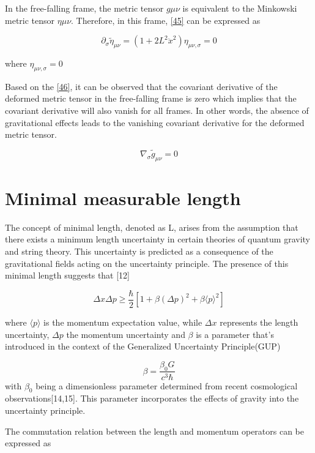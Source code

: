 \documentclass{article}
\begin{document}
In the free-falling frame, the metric tensor $g\mu\nu$ is equivalent to the Minkowski metric tensor $\eta\mu\nu$. Therefore, in this frame, \eqref{45} can be expressed as

\begin{equation}
    \partial_{\sigma}\tilde{\eta}_{\mu\nu} = (1 + 2L^2\ddot x^2)\eta_{\mu\nu,\sigma}=0
\label{46}
\end{equation}

where $\eta_{\mu\nu,\sigma}=0$

Based on the \eqref{46}, it can be observed that the covariant derivative of the deformed metric tensor in the free-falling frame is zero which implies that the covariant derivative will also vanish for all frames. In other words, the absence of gravitational effects leads to the vanishing covariant derivative for the deformed metric tensor.

\begin{equation}
    \nabla_{\sigma}\tilde{g}_{\mu\nu} = 0
\label{47}
\end{equation}


\section{\Large Minimal measurable length}
The concept of minimal length, denoted as L, arises from the assumption that there exists a minimum length uncertainty in certain theories of quantum gravity and string theory. This uncertainty is predicted as a consequence of the gravitational fields acting on the uncertainty principle. The presence of this minimal length suggests that [12]

\begin{equation}
\Delta x \Delta p \geq \frac{\hbar}{2} \left[1 + \beta (\Delta p)^2 + \beta \langle p \rangle^2\right]
\label{eq:6}
\end{equation}

where $\langle p \rangle$ is the momentum expectation value, while $\Delta x $ represents the length uncertainty, $\Delta p$ the momentum uncertainty and $\beta$ is a parameter that's introduced in the context of the Generalized Uncertainty Principle(GUP)

$$\beta=\frac{\beta_0G}{c^3\hbar}$$ 
with $\beta_0$ being a dimensionless parameter determined from recent cosmological observations[14,15]. This parameter incorporates the effects of gravity into the uncertainty principle.

The commutation relation between the length and momentum operators can be expressed as
\end{document}
